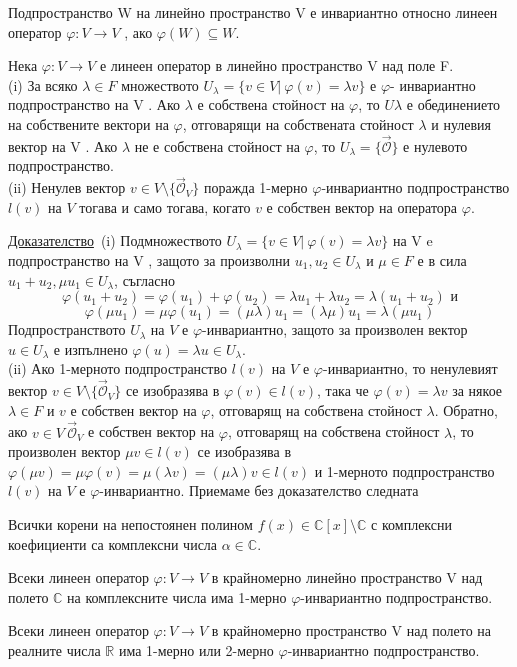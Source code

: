 \documentclass{article}
\newcommand*{\nullvec}{\vec{\mathcal{O}}}
\newcommand{\dok}{\underline{Доказателство}\  }
\newcommand{\tvurdenie}[2]{
    \begin{tcolorbox}[title = #1 ,colframe = blue!70!black, colback = blue!10!white]
        #2
    \end{tcolorbox}
}
\newcommand{\opredelenie}[2]{
    \begin{tcolorbox}[title = #1 ,colframe = red!70!black, colback = red!10!white]
        #2
    \end{tcolorbox}
}
\begin{document}
\opredelenie{Определение 18.9}{
    Подпространство W на линейно пространство
    V е инвариантно относно линеен оператор $\varphi : V \rightarrow V$ , ако $\varphi(W) \subseteq W$.
}
\tvurdenie{Лема 18.10}{
    Нека $\varphi : V \rightarrow V$ е линеен оператор в линейно пространство V над поле F.\\
    (i) За всяко $\lambda\in F$ множеството $U_\lambda = \{v \in V | \  \varphi(v) = \lambda v\}$ е $\varphi$-
    инвариантно подпространство на V . Ако $\lambda$ е собствена стойност на
    $\varphi$, то $U\lambda$ е обединението на собствените вектори на $\varphi$, отговарящи на
    собствената стойност $\lambda$ и нулевия вектор на V . Ако $\lambda$ не е собствена
    стойност на $\varphi$, то $U_\lambda = \{\nullvec\}$ е нулевото подпространство.\\
    (ii) Ненулев вектор $v \in V \setminus \{\nullvec_V \}$ поражда 1-мерно $\varphi$-инвариантно
    подпространство $l(v)$ на $V$ тогава и само тогава, когато $v$ е собствен
    вектор на оператора $\varphi$.
}
\dok (i) Подмножеството $U_\lambda = \{v \in V | \ \varphi(v) = \lambda v\}$ на V e
подпространство на V , защото за произволни $u_1, u_2 \in U_\lambda$ и $\mu \in F$ е в сила
$u_1 + u_2, \mu u_1 \in U_\lambda$, съгласно
\[
    \varphi(u_1 + u_2) = \varphi(u_1) + \varphi(u_2) = \lambda u_1 + \lambda u_2 = \lambda(u_1 + u_2) \text{ и}
\]
\[
    \varphi(\mu u_1) = \mu\varphi(u_1) = (\mu\lambda) u_1 = (\lambda\mu) u_1 = \lambda(\mu u_1)
\]
Подпространството $U_\lambda$ на $V$ е $\varphi$-инвариантно, защото за произволен вектор
$u \in U_\lambda$ е изпълнено $\varphi(u) = \lambda u \in U_\lambda$.\\
(ii) Ако 1-мерното подпространство $l(v)$ на $V$ е $\varphi$-инвариантно, то ненулевият
вектор $v \in V \setminus \{\nullvec_V \}$ се изобразява в $\varphi(v) \in l(v)$, така че
$\varphi(v) = \lambda v$ за някое $\lambda \in F$ и $v$ е собствен вектор на $\varphi$,
отговарящ на собствена стойност $\lambda$. Обратно, ако $v \in V \ {\nullvec_V }$ е собствен вектор
на $\varphi$, отговарящ на собствена стойност $\lambda$, то произволен вектор $\mu v \in l(v)$ се
изобразява в $\varphi(\mu v) = \mu\varphi(v) =\mu(\lambda v) = (\mu\lambda)v \in l(v)$ и 1-мерното подпространство $l(v)$ на $V$ е $\varphi$-инвариантно.
\newpage
Приемаме без доказателство следната
\tvurdenie{Теорема 18.11 (\emph{Основна Теорема на алгебрата})}{
    Всички корени на непостоянен полином $f(x) \in \mathbb{C}[x] \setminus \mathbb{C}$ с
    комплексни коефициенти са комплексни числа $\alpha \in \mathbb{C}$.
}
\tvurdenie{Твърдение 18.12}{
    Всеки линеен оператор $\varphi : V \rightarrow V$ в крайномерно
    линейно пространство V над полето $\mathbb{C}$ на комплексните числа има
    1-мерно $\varphi$-инвариантно подпространство.
}
\tvurdenie{Твърдение 18.13}{
    Всеки линеен оператор $\varphi : V \rightarrow V$ в крайномерно
    пространство V над полето на реалните числа $\mathbb{R}$ има 1-мерно или
    2-мерно $\varphi$-инвариантно подпространство.
}
\end{document}

